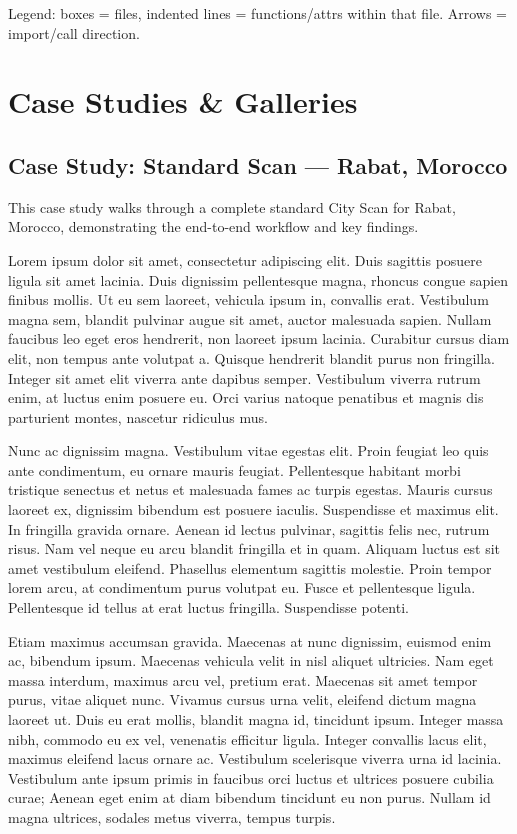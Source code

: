 \documentclass[
  letterpaper,
  DIV=11,
  numbers=noendperiod]{scrreprt}
\begin{document}
Legend: boxes = files, indented lines = functions/attrs within that
file. Arrows = import/call direction.

\part{Case Studies \& Galleries}

\chapter{Case Study: Standard Scan --- Rabat,
Morocco}\label{case-study-standard-scan-rabat-morocco}

This case study walks through a complete standard City Scan for Rabat,
Morocco, demonstrating the end-to-end workflow and key findings.

Lorem ipsum dolor sit amet, consectetur adipiscing elit. Duis sagittis
posuere ligula sit amet lacinia. Duis dignissim pellentesque magna,
rhoncus congue sapien finibus mollis. Ut eu sem laoreet, vehicula ipsum
in, convallis erat. Vestibulum magna sem, blandit pulvinar augue sit
amet, auctor malesuada sapien. Nullam faucibus leo eget eros hendrerit,
non laoreet ipsum lacinia. Curabitur cursus diam elit, non tempus ante
volutpat a. Quisque hendrerit blandit purus non fringilla. Integer sit
amet elit viverra ante dapibus semper. Vestibulum viverra rutrum enim,
at luctus enim posuere eu. Orci varius natoque penatibus et magnis dis
parturient montes, nascetur ridiculus mus.

Nunc ac dignissim magna. Vestibulum vitae egestas elit. Proin feugiat
leo quis ante condimentum, eu ornare mauris feugiat. Pellentesque
habitant morbi tristique senectus et netus et malesuada fames ac turpis
egestas. Mauris cursus laoreet ex, dignissim bibendum est posuere
iaculis. Suspendisse et maximus elit. In fringilla gravida ornare.
Aenean id lectus pulvinar, sagittis felis nec, rutrum risus. Nam vel
neque eu arcu blandit fringilla et in quam. Aliquam luctus est sit amet
vestibulum eleifend. Phasellus elementum sagittis molestie. Proin tempor
lorem arcu, at condimentum purus volutpat eu. Fusce et pellentesque
ligula. Pellentesque id tellus at erat luctus fringilla. Suspendisse
potenti.

Etiam maximus accumsan gravida. Maecenas at nunc dignissim, euismod enim
ac, bibendum ipsum. Maecenas vehicula velit in nisl aliquet ultricies.
Nam eget massa interdum, maximus arcu vel, pretium erat. Maecenas sit
amet tempor purus, vitae aliquet nunc. Vivamus cursus urna velit,
eleifend dictum magna laoreet ut. Duis eu erat mollis, blandit magna id,
tincidunt ipsum. Integer massa nibh, commodo eu ex vel, venenatis
efficitur ligula. Integer convallis lacus elit, maximus eleifend lacus
ornare ac. Vestibulum scelerisque viverra urna id lacinia. Vestibulum
ante ipsum primis in faucibus orci luctus et ultrices posuere cubilia
curae; Aenean eget enim at diam bibendum tincidunt eu non purus. Nullam
id magna ultrices, sodales metus viverra, tempus turpis.
\end{document}
